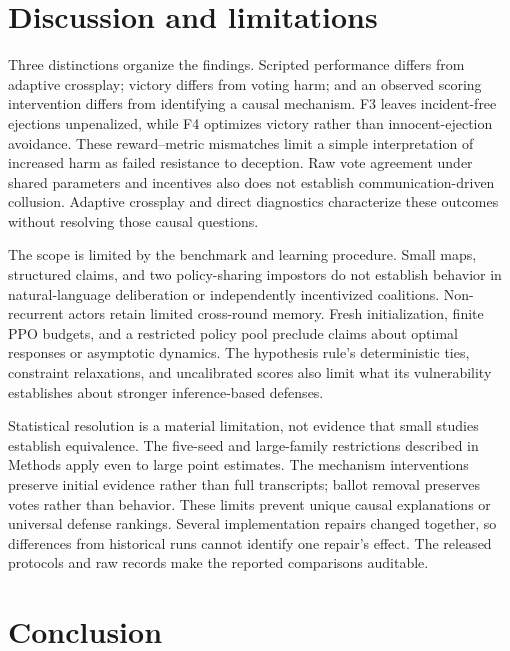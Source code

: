 \documentclass[
  12pt,
]{article}
\begin{document}
\FloatBarrier

\section{Discussion and limitations}\label{discussion-and-limitations}

Three distinctions organize the findings. Scripted performance differs
from adaptive crossplay; victory differs from voting harm; and an
observed scoring intervention differs from identifying a causal
mechanism. F3 leaves incident-free ejections unpenalized, while F4
optimizes victory rather than innocent-ejection avoidance. These
reward--metric mismatches limit a simple interpretation of increased
harm as failed resistance to deception. Raw vote agreement under shared
parameters and incentives also does not establish communication-driven
collusion. Adaptive crossplay and direct diagnostics characterize these
outcomes without resolving those causal questions.

The scope is limited by the benchmark and learning procedure. Small
maps, structured claims, and two policy-sharing impostors do not
establish behavior in natural-language deliberation or independently
incentivized coalitions. Non-recurrent actors retain limited cross-round
memory. Fresh initialization, finite PPO budgets, and a restricted
policy pool preclude claims about optimal responses or asymptotic
dynamics. The hypothesis rule's deterministic ties, constraint
relaxations, and uncalibrated scores also limit what its vulnerability
establishes about stronger inference-based defenses.

Statistical resolution is a material limitation, not evidence that small
studies establish equivalence. The five-seed and large-family
restrictions described in Methods apply even to large point estimates.
The mechanism interventions preserve initial evidence rather than full
transcripts; ballot removal preserves votes rather than behavior. These
limits prevent unique causal explanations or universal defense rankings.
Several implementation repairs changed together, so differences from
historical runs cannot identify one repair's effect. The released
protocols and raw records make the reported comparisons auditable.

\FloatBarrier

\section{Conclusion}\label{conclusion}
\end{document}

